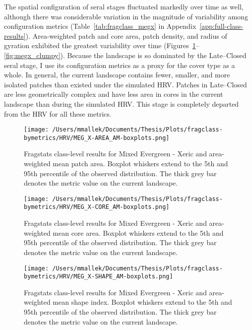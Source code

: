 The spatial configuration of seral stages fluctuated markedly over time as well, although there was considerable variation in the magnitude of variability among configuration metrics (Table~\ref{tab:fragclass_megx} in Appendix~\ref{app:full-class-results}). Area-weighted patch and core area, patch density, and radius of gyration exhibited the greatest variability over time (Figures~\ref{fig:megx_areaam}--\ref{fig:megx_clumpy}). Because the landscape is so dominated by the Late--Closed seral stage, I use its configuration metrics as a proxy for the cover type as a whole. In general, the current landscape contains fewer, smaller, and more isolated patches than existed under the simulated HRV. Patches in Late--Closed are less geometrically complex and have less area in cores in the current landscape than during the simulated HRV. This stage is completely departed from the HRV for all these metrics.

\begin{figure}[!htbp]
\centering
    \texttt{[image: /Users/mmallek/Documents/Thesis/Plots/fragclass-bymetrics/HRV/MEG\_X-AREA\_AM-boxplots.png]}
  \caption{Fragstats class-level results for Mixed Evergreen - Xeric and area-weighted mean patch area. Boxplot whiskers extend to the 5th and 95th percentile of the observed distribution. The thick grey bar denotes the metric value on the current landscape.}
  \label{fig:megx_areaam}
\end{figure}


\begin{figure}[!htbp]
\centering
    \texttt{[image: /Users/mmallek/Documents/Thesis/Plots/fragclass-bymetrics/HRV/MEG\_X-CORE\_AM-boxplots.png]}
  \caption{Fragstats class-level results for Mixed Evergreen - Xeric and area-weighted mean core area. Boxplot whiskers extend to the 5th and 95th percentile of the observed distribution. The thick grey bar denotes the metric value on the current landscape.}
  \label{fig:megx_coream}
\end{figure}


\begin{figure}[!htbp]
\centering
    \texttt{[image: /Users/mmallek/Documents/Thesis/Plots/fragclass-bymetrics/HRV/MEG\_X-SHAPE\_AM-boxplots.png]}
  \caption{Fragstats class-level results for Mixed Evergreen - Xeric and area-weighted mean shape index. Boxplot whiskers extend to the 5th and 95th percentile of the observed distribution. The thick grey bar denotes the metric value on the current landscape.}
  \label{fig:megx_shapeam}
\end{figure}


